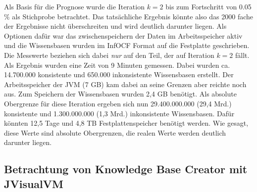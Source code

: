 \documentclass[12pt,a4paper]{article}
\begin{document}
Als Basis für die Prognose wurde die Iteration $k=2$ bis zum Fortschritt von 0.05 $\%$ als Stichprobe betrachtet. Das tatsächliche Ergebnis könnte also das 2000 fache der Ergebnisse nicht überschreiten und wird  deutlich darunter liegen. Als Optionen dafür war das zwischenspeichern der Daten im Arbeitsspeicher aktiv und die Wissensbasen wurden im InfOCF Format auf die Festplatte geschrieben. Die Messwerte beziehen sich dabei \textit{nur} auf den Teil, der auf Iteration $k=2$ fällt. Als Ergebnis wurden eine Zeit von 9 Minuten gemessen. Dabei wurden ca. 14.700.000 konsistente und 650.000 inkonsistente Wissensbasen erstellt. Der Arbeitsspeicher der JVM (7 GB) kam dabei an seine Grenzen aber reichte noch aus. Zum Speichern der Wissensbasen wurden 2,4 GB benötigt. Als absolute Obergrenze für diese Iteration ergeben sich nun 29.400.000.000 (29,4 Mrd.) konsistente und 1.300.000.000 (1,3 Mrd.) inkonsistente Wissensbasen. Dafür könnten 12,5 Tage und 4,8 TB Festplattenspeicher benötigt werden. Wie gesagt, diese Werte sind absolute Obergrenzen, die realen Werte werden deutlich darunter liegen.


\subsection{Betrachtung von Knowledge Base Creator mit JVisualVM}
\end{document}
